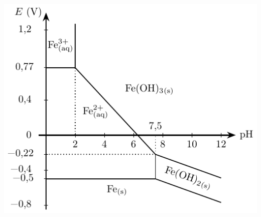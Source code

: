 \documentclass[a4paper, 10pt, final, garamond]{book}
\begin{document}
\begin{enumerate}[label=\sqenumi]
\begin{minipage}[t]{.32\linewidth}
\begin{center}
{			}{
				\includegraphics[width=\linewidth]{eph_fer}
			}
			\vspace{-15pt}
		\end{center}
	\end{minipage}
	\smallbreak
	\begin{enumerate}

\end{enumerate}
\end{enumerate}
\end{document}
